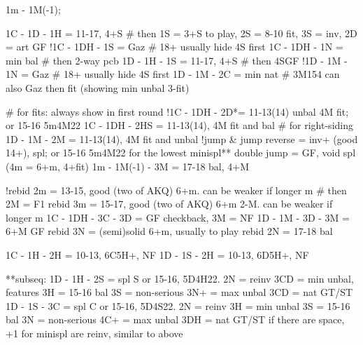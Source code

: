 1m - 1M(-1); 

1C - 1D - 1H = 11-17, 4+S  # then 1S = 3+S to play, 2S = 8-10 fit, 3S = inv, 2D = art GF
!1C - 1DH - 1S = Gaz        # 18+ usually hide 4S first
1C - 1DH - 1N = min bal    # then 2-way pcb
1D - 1H - 1S = 11-17, 4+S  # then 4SGF
!1D - 1M - 1N = Gaz         # 18+ usually hide 4S first
1D - 1M - 2C = min nat     # 3M154 can also Gaz then fit (showing min unbal 3-fit)

# for fits: always show in first round
!1C - 1DH - 2D*= 11-13(14) unbal 4M fit; or 15-16 5m4M22
1C - 1DH - 2HS = 11-13(14), 4M fit and bal  # for right-siding
1D - 1M - 2M = 11-13(14), 4M fit and unbal
!jump & jump reverse = inv+ (good 14+), spl; or 15-16 5m4M22 for the lowest minispl**
double jump = GF, void spl (4m = 6+m, 4+fit)
1m - 1M(-1) - 3M = 17-18 bal, 4+M

!rebid 2m = 13-15, good (two of AKQ) 6+m. can be weaker if longer m  # then 2M = F1
rebid 3m = 15-17, good (two of AKQ) 6+m 2-M. can be weaker if longer m
    1C - 1DH - 3C - 3D = GF checkback, 3M = NF
    1D - 1M - 3D - 3M = 6+M GF
rebid 3N = (semi)solid 6+m, usually to play
rebid 2N = 17-18 bal

1C - 1H - 2H = 10-13, 6C5H+, NF
1D - 1S - 2H = 10-13, 6D5H+, NF

**subseq:
1D - 1H - 2S = spl S or 15-16, 5D4H22. 
    2N = reinv
        3CD = min unbal, features
        3H = 15-16 bal
        3S = non-serious
        3N+ = max unbal
    3CD = nat GT/ST
1D - 1S - 3C = spl C or 15-16, 5D4S22. 
    2N = reinv
        3H = min unbal
        3S = 15-16 bal
        3N = non-serious
        4C+ = max unbal
    3DH = nat GT/ST
if there are space, +1 for minispl are reinv, similar to above